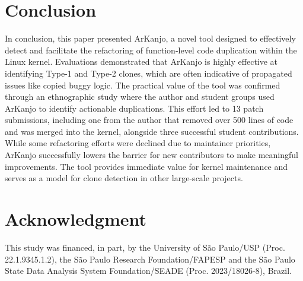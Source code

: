 \documentclass[conference]{IEEEtran}
\begin{document}
\section{Conclusion}

In conclusion, this paper presented ArKanjo, a novel tool designed to effectively detect 
and facilitate the refactoring of function-level code duplication within the Linux kernel. 
Evaluations demonstrated that ArKanjo is highly effective at identifying Type-1 and Type-2 
clones, which are often indicative of propagated issues like copied buggy logic. The practical 
value of the tool was confirmed through an ethnographic study where the author and student 
groups used ArKanjo to identify actionable duplications. This effort led to 13 patch 
submissions, including one from the author that removed over 500 lines of code and was merged 
into the kernel, alongside three successful student contributions. While some refactoring 
efforts were declined due to maintainer priorities, ArKanjo successfully lowers the barrier 
for new contributors to make meaningful improvements. The tool provides immediate value for 
kernel maintenance and serves as a model for clone detection in other large-scale projects.

\section*{Acknowledgment}

This study was financed, in part, by  the University of
São Paulo/USP (Proc. 22.1.9345.1.2), the São Paulo Research Foundation/FAPESP
and the São Paulo State Data Analysis System Foundation/SEADE (Proc. 2023/18026-8), Brazil.



\end{document}
